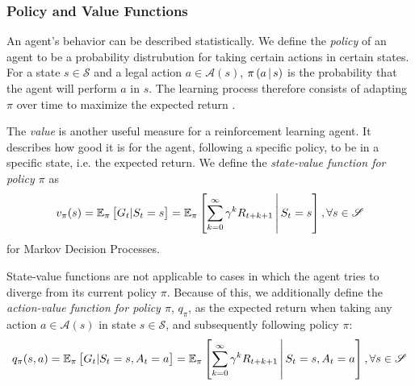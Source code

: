 \subsubsection{Policy and Value Functions}
An agent's behavior can be described statistically. We define the \textit{policy} of an agent to be a probability distrubution for taking certain actions in certain states. For a state $s \in \mathscr{S}$ and a legal action $a \in \mathscr{A}(s)$, $\pi\left(a \,\middle|\, s\right)$ is the probability that the agent will perform $a$ in $s$. The learning process therefore consists of adapting $\pi$ over time to maximize the expected return \cite{bible}.

The \textit{value} is another useful measure for a reinforcement learning agent. It describes how good it is for the agent, following a specific policy, to be in a specific state, i.e. the expected return. We define the \textit{state-value function for policy $\pi$} \cite{bible} as
\begin{equation*}
    v_\pi(s) = \mathbb{E}_\pi\left[G_t | S_t = s\right]
             = \mathbb{E}_\pi\left[\sum_{k=0}^\infty \gamma^k R_{t+k+1} \,\middle|\, S_t = s\right], \forall s \in \mathscr{S}
\end{equation*}
for Markov Decision Processes.

State-value functions are not applicable to cases in which the agent tries to diverge from its current policy $\pi$. Because of this, we additionally define the \textit{action-value function for policy $\pi$}, $q_\pi$, \cite{bible} as the expected return when taking any action $a \in \mathscr{A}(s)$ in state $s \in \mathscr{S}$, and subsequently following policy $\pi$:
\begin{equation*}
    q_\pi(s, a) = \mathbb{E}_\pi\left[G_t | S_t = s, A_t = a\right]
             = \mathbb{E}_\pi\left[\sum_{k=0}^\infty \gamma^k R_{t+k+1} \,\middle|\, S_t = s, A_t = a\right], \forall s \in \mathscr{S}
\end{equation*}